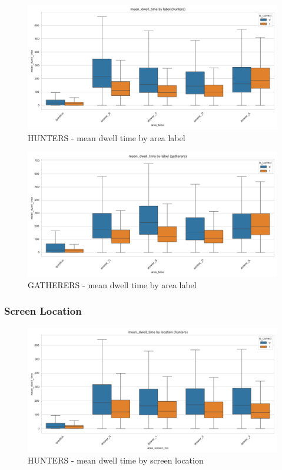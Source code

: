 \documentclass{article}
\begin{document}
\begin{figure}[H]
    \centering
    \includegraphics[width=0.8\linewidth]{plots/boxplots/boxplot_area_label_mean_dwell_time_hunters.png}
    \caption{HUNTERS - mean dwell time by area label}
    \label{fig:dt_hunt_al}
\end{figure}

\begin{figure}[H]
    \centering
    \includegraphics[width=0.8\linewidth]{plots/boxplots/boxplot_area_label_mean_dwell_time_gatherers.png}
    \caption{GATHERERS - mean dwell time by area label}
    \label{fig:dt_gath_al}
\end{figure}

\subsubsection{Screen Location}

\begin{figure}[H]
    \centering
    \includegraphics[width=0.8\linewidth]{plots/boxplots/boxplot_area_screen_loc_mean_dwell_time_hunters.png}
    \caption{HUNTERS - mean dwell time by screen location}
    \label{fig:dt_hunt_sl}
\end{figure}
\end{document}
